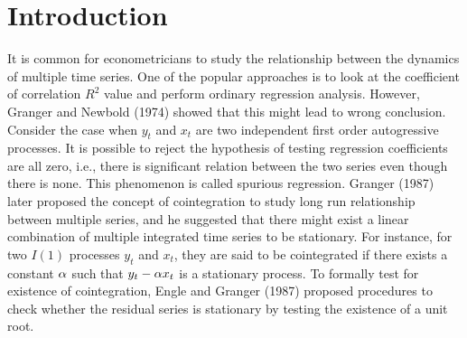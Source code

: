 \chapter{Introduction}
\ifpdf
    \graphicspath{{Introduction/IntroductionFigs/PNG/}{Introduction/IntroductionFigs/PDF/}{Introduction/IntroductionFigs/}}
\else
    \graphicspath{{Introduction/IntroductionFigs/EPS/}{Introduction/IntroductionFigs/}}
\fi

It is common for econometricians to study the relationship between the dynamics of multiple time series. One of the popular approaches is to look at the coefficient of correlation $R^2$ value and perform ordinary regression analysis. However, Granger and Newbold (1974) showed that this might lead to wrong conclusion. Consider the case when $y_t$ and $x_t$ are two independent first order autogressive processes. It is possible to reject the hypothesis of testing regression coefficients are all zero, i.e., there is significant relation between the two series even though there is none. This phenomenon is called spurious regression. Granger (1987) later proposed the concept of cointegration to study long run relationship between multiple series, and he suggested that there might exist a linear combination of multiple integrated time series to be stationary. For instance, for two $I(1)$ processes $y_t$ and $x_t$, they are said to be cointegrated if there exists a constant $\alpha$ such that $y_t - \alpha x_t$ is a stationary process. To formally test for existence of cointegration, Engle and Granger (1987) proposed procedures to check whether the residual series is stationary by testing the existence of a unit root.

